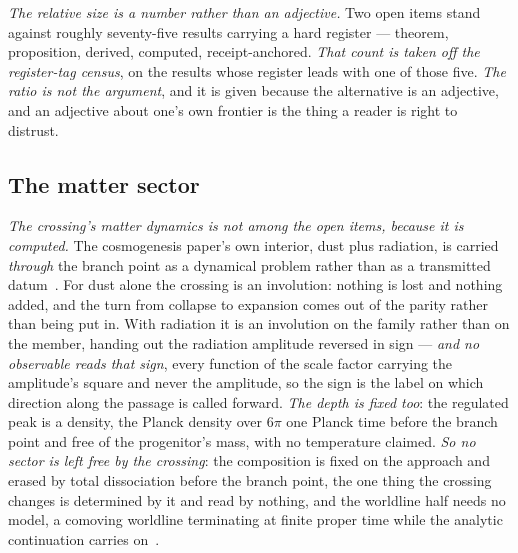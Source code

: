 \documentclass[11pt,a4paper]{article}
\theoremstyle{plain}
\theoremstyle{definition}
\begin{document}
\emph{The relative size is a number rather than an adjective.} Two open items stand against roughly
seventy-five results carrying a hard register --- theorem, proposition, derived, computed, receipt-anchored. \emph{That count is taken off the register-tag census}, on the results whose register leads with one of those five.
\emph{The ratio is not the argument}, and it is given because the alternative is an adjective, and an
adjective about one's own frontier is the thing a reader is right to distrust.

\subsection{The matter sector}

\emph{The crossing's matter dynamics is not among the open items, because it is computed.} The
cosmogenesis paper's own interior, dust plus radiation, is carried \emph{through} the branch point as a
dynamical problem rather than as a transmitted datum~\cite{JanzenCosmogenesis}. For dust alone the crossing
is an involution: nothing is lost and nothing added, and the turn from collapse to expansion comes out of the
parity rather than being put in. With radiation it is an involution on the family rather than on the member,
handing out the radiation amplitude reversed in sign --- \emph{and no observable reads that sign}, every
function of the scale factor carrying the amplitude's square and never the amplitude, so the sign is the
label on which direction along the passage is called forward. \emph{The depth is fixed too}: the regulated
peak is a density, the Planck density over $6\pi$ one Planck time before the branch point and free of the
progenitor's mass, with no temperature claimed. \emph{So no sector is left free by the crossing}: the
composition is fixed on the approach and erased by total dissociation before the branch point, the one thing
the crossing changes is determined by it and read by nothing, and the worldline half needs no model, a
comoving worldline terminating at finite proper time while the analytic continuation carries
on~\cite{JanzenCosmogenesis,JanzenCRcosmology}.
\end{document}
